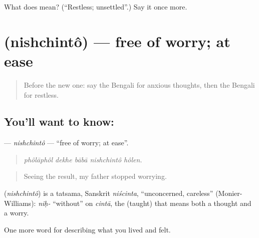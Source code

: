 \begin{tcolorbox}[breakable,colback=teal!4,colframe=teal!35!black,title={Before you move on}]
What does  mean? (\textquotedblleft{}Restless; unsettled\textquotedblright{}.) Say it once more.
\end{tcolorbox}
\section[\texorpdfstring{\bn{নিশ্চিন্ত} (nishchintô)}{নিশ্চিন্ত (nishchintô)}]{ (nishchintô) — free of worry; at ease}

\label{lesson:BN-C442-nishchinto}



\begin{quote}
Before the new one: say the Bengali for anxious thoughts, then the Bengali for restless.
\end{quote}

\subsection*{You'll want to know: }
\textbf{} — \emph{nishchintô} — \textquotedblleft{}free of worry; at ease\textquotedblright{}.

\begin{quote}
    
\end{quote}

\begin{quote}
\emph{phôlāphôl dekhe bābā nishchintô hôlen.}
\end{quote}

\begin{quote}
Seeing the result, my father stopped worrying.
\end{quote}

\begin{cousinweb}
\textbf{} (\emph{nishchintô}) is a tatsama, Sanskrit \emph{niścinta}, \textquotedblleft{}unconcerned, careless\textquotedblright{} (Monier-Williams): \emph{niḥ-} \textquotedblleft{}without\textquotedblright{} on \emph{cintā}, the  (taught) that means both a thought and a worry.
\end{cousinweb}

\begin{grammarlens}[title={What you've built}]
One more word for describing what you lived and felt.
\end{grammarlens}

